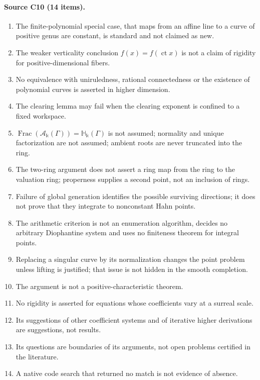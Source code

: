 \documentclass[11pt,oneside]{article}
\numberwithin{equation}{section}
\theoremstyle{definition}
\theoremstyle{remark}
\newcommand{\ct}{\operatorname{ct}}
\newcommand{\Frac}{\operatorname{Frac}}
\newcommand{\crH}{\mathbb H_\Bbbk(\Gamma)}
\newcommand{\crA}{\mathcal A_\Bbbk(\Gamma)}
\begin{document}
\paragraph{Source C10 (14 items).}
\begin{enumerate}[leftmargin=*,itemsep=1pt]
\item The finite-polynomial special case, that maps from an affine line to a curve of
positive genus are constant, is standard and not claimed as new.
\item The weaker verticality conclusion $f(x)=f(\ct x)$ is not a claim of rigidity for
positive-dimensional fibers.
\item No equivalence with uniruledness, rational connectedness or the existence of
polynomial curves is asserted in higher dimension.
\item The clearing lemma may fail when the clearing exponent is confined to a fixed
workspace.
\item $\Frac(\crA)=\crH$ is not assumed; normality and unique factorization are not
assumed; ambient roots are never truncated into the ring.
\item The two-ring argument does not assert a ring map from the ring to the valuation
ring; properness supplies a second point, not an inclusion of rings.
\item Failure of global generation identifies the possible surviving directions; it
does not prove that they integrate to nonconstant Hahn points.
\item The arithmetic criterion is not an enumeration algorithm, decides no arbitrary
Diophantine system and uses no finiteness theorem for integral points.
\item Replacing a singular curve by its normalization changes the point problem unless
lifting is justified; that issue is not hidden in the smooth completion.
\item The argument is not a positive-characteristic theorem.
\item No rigidity is asserted for equations whose coefficients vary at a surreal scale.
\item Its suggestions of other coefficient systems and of iterative higher derivations
are suggestions, not results.
\item Its questions are boundaries of its arguments, not open problems certified in the
literature.
\item A native code search that returned no match is not evidence of absence.
\end{enumerate}
\end{document}
